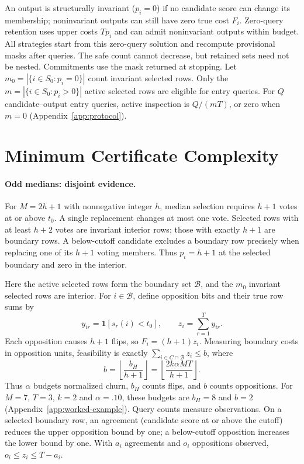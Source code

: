 \documentclass[11pt]{article}
\newcommand{\one}{\mathbf{1}}
\begin{document}
An output is structurally invariant ($p_i=0$) if no candidate score can change its membership; noninvariant outputs can still have zero true cost $F_i$. Zero-query retention uses upper costs $Tp_i$ and can admit noninvariant outputs within budget. All strategies start from this zero-query solution and recompute provisional masks after queries. The safe count cannot decrease, but retained sets need not be nested. Commitments use the mask returned at stopping. Let $m_0=|\{i\in S_0:p_i=0\}|$ count invariant selected rows. Only the $m=|\{i\in S_0:p_i>0\}|$ active selected rows are eligible for entry queries. For $Q$ candidate--output entry queries, active inspection is $Q/(mT)$, or zero when $m=0$ (Appendix~\ref{app:protocol}).

\section{Minimum Certificate Complexity}
\label{sec:median}
\paragraph{Odd medians: disjoint evidence.}
For $M=2h+1$ with nonnegative integer $h$, median selection requires $h+1$ votes at or above $t_0$. A single replacement changes at most one vote. Selected rows with at least $h+2$ votes are invariant interior rows; those with exactly $h+1$ are boundary rows. A below-cutoff candidate excludes a boundary row precisely when replacing one of its $h+1$ voting members. Thus $p_i=h+1$ at the selected boundary and zero in the interior.

Here the active selected rows form the boundary set $\mathcal B$, and the $m_0$ invariant selected rows are interior. For $i\in\mathcal B$, define opposition bits and their true row sums by
\[
 y_{ir}=\one[s_r(i)<t_0],\qquad z_i=\sum_{r=1}^{T}y_{ir}.
\]
Each opposition causes $h+1$ flips, so $F_i=(h+1)z_i$. Measuring boundary costs in opposition units, feasibility is exactly $\sum_{i\in C\cap\mathcal B}z_i\le b$, where
\begin{equation}
 b=\left\lfloor\frac{b_H}{h+1}\right\rfloor=\left\lfloor\frac{2k\alpha MT}{h+1}\right\rfloor.
 \label{eq:booleanbudget}
\end{equation}
Thus $\alpha$ budgets normalized churn, $b_H$ counts flips, and $b$ counts oppositions. For $M=7$, $T=3$, $k=2$ and $\alpha=.10$, these budgets are $b_H=8$ and $b=2$ (Appendix~\ref{app:worked-example}). Query counts measure observations. On a selected boundary row, an agreement (candidate score at or above the cutoff) reduces the upper opposition bound by one; a below-cutoff opposition increases the lower bound by one. With $a_i$ agreements and $o_i$ oppositions observed, $o_i\le z_i\le T-a_i$.
\end{document}
